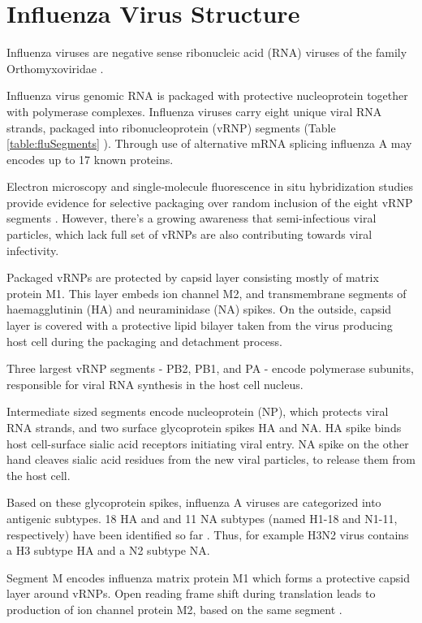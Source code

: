 \section{Influenza Virus Structure}

Influenza viruses are negative sense ribonucleic acid (RNA) viruses of the family Orthomyxoviridae \cite{Orthomyxoviridae2011}.

Influenza virus genomic RNA is packaged with protective nucleoprotein together with polymerase complexes. Influenza viruses carry eight unique viral RNA strands, packaged into ribonucleoprotein  (vRNP) segments (Table \ref{table:fluSegments} \cite{das2010structures, dubois2014influenza}). Through use of alternative mRNA splicing influenza A may encodes up to 17 known proteins.

Electron microscopy and single‑molecule fluorescence in situ hybridization studies provide evidence for selective packaging over random inclusion of the eight vRNP segments \cite{eisfeld2015centre}. However, there's a growing awareness that semi-infectious viral particles, which lack full set of vRNPs are also contributing towards viral infectivity.

Packaged vRNPs are protected by capsid layer consisting mostly of matrix protein M1. This layer embeds ion channel M2, and transmembrane segments of haemagglutinin (HA) and neuraminidase (NA) spikes. On the outside, capsid layer is covered with a protective lipid bilayer taken from the virus producing host cell during the packaging and detachment process.

Three largest vRNP segments - PB2, PB1, and PA - encode polymerase subunits, responsible for viral RNA synthesis in the host cell nucleus.

Intermediate sized segments encode nucleoprotein (NP), which protects viral RNA strands, and two surface glycoprotein spikes HA and NA. HA spike binds host cell-surface sialic acid receptors initiating viral entry. NA spike on the other hand cleaves sialic acid residues from the new viral particles, to release them from the host cell.

Based on these glycoprotein spikes, influenza A viruses are categorized into antigenic subtypes. 18 HA and and 11 NA subtypes (named H1-18 and N1-11, respectively) have been identified so far \cite{InfluenzaAAntigenicSubtypes}. Thus, for example H3N2 virus contains a H3 subtype HA and a N2 subtype NA.

Segment M encodes influenza matrix protein M1 which forms a protective capsid layer around vRNPs. Open reading frame shift during translation leads to production of ion channel protein M2, based on the same segment \cite{dubois2014influenza}.

